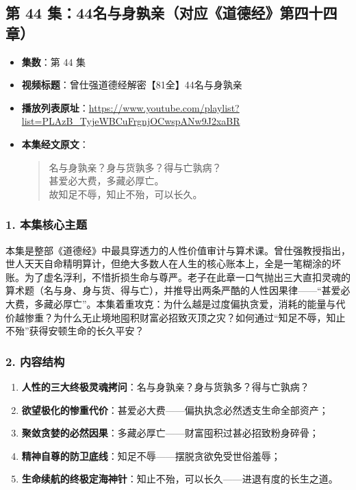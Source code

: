 \clearpage

\subsection{第 44 集：44名与身孰亲（对应《道德经》第四十四章）}
\label{sec:ep44}

\begin{itemize}
    \item \textbf{集数}：第 44 集
    \item \textbf{视频标题}：曾仕强道德经解密【81全】44名与身孰亲
    \item \textbf{播放列表原址}：\url{https://www.youtube.com/playlist?list=PLAzB_TyjeWBCuFrgnjOCwspANw9J2xaBR}
    \item \textbf{本集经文原文}：
    \begin{quote}\kaishu
    名与身孰亲？身与货孰多？得与亡孰病？\\
    甚爱必大费，多藏必厚亡。\\
    故知足不辱，知止不殆，可以长久。
    \end{quote}
\end{itemize}

\subsubsection{1. 本集核心主题}
本集是整部《道德经》中最具穿透力的人性价值审计与算术课。曾仕强教授指出，世人天天自命精明算计，但绝大多数人在人生的核心账本上，全是一笔糊涂的坏账。为了虚名浮利，不惜折损生命与尊严。老子在此章一口气抛出三大直扣灵魂的算术题（名与身、身与货、得与亡），并推导出两条严酷的人性因果律——“甚爱必大费，多藏必厚亡”。本集着重攻克：为什么越是过度偏执贪爱，消耗的能量与代价越惨重？为什么无止境地囤积财富必招致灭顶之灾？如何通过“知足不辱，知止不殆”获得安顿生命的长久平安？

\subsubsection{2. 内容结构}
\begin{enumerate}
    \item \textbf{人性的三大终极灵魂拷问}：名与身孰亲？身与货孰多？得与亡孰病？
    \item \textbf{欲望极化的惨重代价}：甚爱必大费——偏执执念必然透支生命全部资产；
    \item \textbf{聚敛贪婪的必然因果}：多藏必厚亡——财富囤积过甚必招致粉身碎骨；
    \item \textbf{精神自尊的防卫底线}：知足不辱——摆脱贪欲免受世俗羞辱；
    \item \textbf{生命续航的终极定海神针}：知止不殆，可以长久——进退有度的长生之道。
\end{enumerate}

